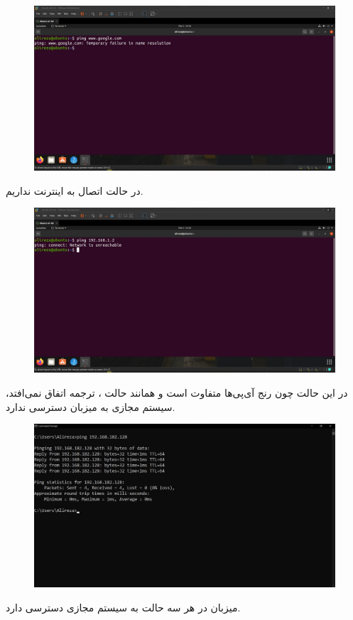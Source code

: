 \documentclass{article}
\begin{document}
\subsection{}
\begin{figure}[H]
    \centering
    \includegraphics[width=1.0\textwidth]{figures/6a.jpg}
    \caption
	{
	}
    \label{fig:fig1}
\end{figure}
در حالت  اتصال به اینترنت نداریم.
\begin{figure}[H]
    \centering
    \includegraphics[width=1.0\textwidth]{figures/6b.jpg}
    \caption
	{
	}
    \label{fig:fig1}
\end{figure}
در این حالت چون رنج آی‌پی‌ها متفاوت است و همانند حالت ، ترجمه اتفاق نمی‌افتد، سیستم مجازی به میزبان دسترسی ندارد.
\begin{figure}[H]
    \centering
    \includegraphics[width=1.0\textwidth]{figures/6c.jpg}
    \caption
	{
	}
    \label{fig:fig1}
\end{figure}
میزبان در هر سه حالت به سیستم مجازی دسترسی دارد.
\end{document}
